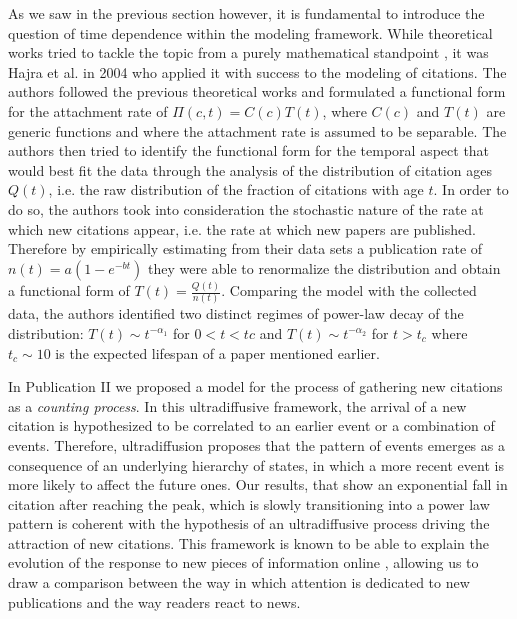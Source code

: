 As we saw in the previous section however, it is fundamental to introduce the  question of time dependence within the modeling framework. While theoretical works tried to tackle the topic from a purely mathematical standpoint \cite{Amaral2000,PhysRevE.68.056121}, it 
was Hajra et al. \cite{Hajra200544} in 2004 who applied it with success to the modeling of citations. 
The authors followed the previous theoretical works and formulated a functional form for the attachment rate of 
$\Pi(c,t) = C(c)T(t)$, where $C(c)$ and $T(t)$ are generic functions and where the attachment rate is assumed to be separable. The authors then tried to identify the functional form for the temporal aspect that would best fit the data through the analysis of the distribution of citation ages $Q(t)$, i.e. the raw distribution
of the fraction of citations with age $t$. In order to do so, the authors took
into consideration the stochastic nature of the rate at which new citations appear, i.e. the rate at which new papers are published. Therefore by empirically estimating from their data sets a publication rate
of $n(t) = a(1 - e^{-bt})$ they were able to renormalize the distribution and obtain a functional form of $T(t) = \frac{Q(t)}{n(t)}$. Comparing the model with the collected data, the authors identified
two  distinct regimes of power-law decay of the distribution: $T(t)\sim t^{-\alpha_{1}}$ for  $0<t<tc$  and $T(t) \sim t^{-\alpha_{2}} $ for $t>t_{c}$ where $t_{c} \sim 10$ is the expected lifespan of a paper mentioned earlier.

In Publication II we proposed a model for the process of gathering new citations as a \textit{counting process}. In this ultradiffusive framework, the arrival of a new citation is hypothesized to be  correlated to an earlier event or a combination of events.
Therefore, 
ultradiffusion
proposes that the pattern of events emerges as a consequence of an underlying hierarchy of states, in which a more recent event is more likely to affect the future ones. Our results, that show an exponential fall
in citation after reaching the peak, which is slowly transitioning into a power law pattern is coherent with the hypothesis of an ultradiffusive process driving the attraction of new citations.
This framework is known to be 
able to explain the evolution of the response to new pieces of information online \cite{ghosh_information_2013}, allowing us to draw a comparison between the way in which attention is dedicated to new publications and the way
readers react to news. 


